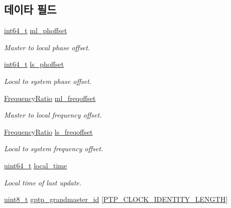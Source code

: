 \subsection*{데이타 필드}
\begin{DoxyCompactItemize}
\item 
\hyperlink{parse_8c_a67a9885ef4908cb72ce26d75b694386c}{int64\+\_\+t} \hyperlink{structg_ptp_time_data_a707b32410dd96584191405fcc6b1b10d}{ml\+\_\+phoffset}
\begin{DoxyCompactList}\small\item\em Master to local phase offset. \end{DoxyCompactList}\item 
\hyperlink{parse_8c_a67a9885ef4908cb72ce26d75b694386c}{int64\+\_\+t} \hyperlink{structg_ptp_time_data_a092b9f356daa2757877b51e4084366be}{ls\+\_\+phoffset}
\begin{DoxyCompactList}\small\item\em Local to system phase offset. \end{DoxyCompactList}\item 
\hyperlink{ptptypes_8hpp_a84de47dc2ed889ecd2b61706d3ad0f2e}{Frequency\+Ratio} \hyperlink{structg_ptp_time_data_aafeb4d0fa7d3cb53ee3686b804e47617}{ml\+\_\+freqoffset}
\begin{DoxyCompactList}\small\item\em Master to local frequency offset. \end{DoxyCompactList}\item 
\hyperlink{ptptypes_8hpp_a84de47dc2ed889ecd2b61706d3ad0f2e}{Frequency\+Ratio} \hyperlink{structg_ptp_time_data_a396f365f5e7c66610f076359c5d99c6e}{ls\+\_\+freqoffset}
\begin{DoxyCompactList}\small\item\em Local to system frequency offset. \end{DoxyCompactList}\item 
\hyperlink{parse_8c_aec6fcb673ff035718c238c8c9d544c47}{uint64\+\_\+t} \hyperlink{structg_ptp_time_data_a77a3c33b68032d5db3c0c556a80ef651}{local\+\_\+time}
\begin{DoxyCompactList}\small\item\em Local time of last update. \end{DoxyCompactList}\item 
\hyperlink{stdint_8h_aba7bc1797add20fe3efdf37ced1182c5}{uint8\+\_\+t} \hyperlink{structg_ptp_time_data_a91da646ac8f2da272fe3b8941c3f4d54}{gptp\+\_\+grandmaster\+\_\+id} \mbox{[}\hyperlink{windows__ipc_8hpp_afd1566058ed7927c2b790c9d4a0051ec}{P\+T\+P\+\_\+\+C\+L\+O\+C\+K\+\_\+\+I\+D\+E\+N\+T\+I\+T\+Y\+\_\+\+L\+E\+N\+G\+TH}\mbox{]}

\end{DoxyCompactItemize}
